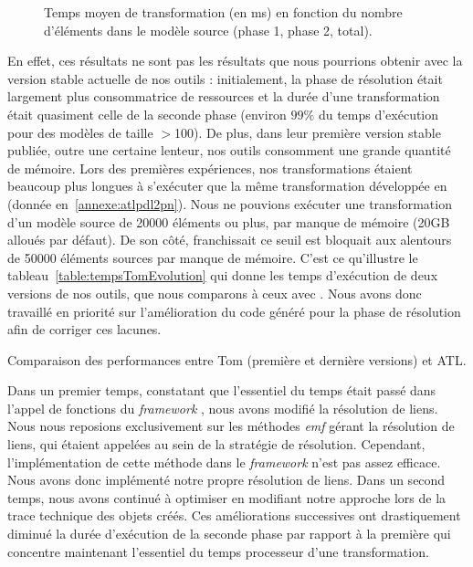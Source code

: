 \begin{figure}[h]
  \begin{center}
    
  \caption{Temps moyen de transformation (en ms) en fonction du nombre d'éléments
  dans le modèle source (phase 1, phase 2, total).}
  \label{fig:courbeTemps}
  \end{center}
\end{figure}

En effet, ces résultats ne sont pas les résultats que nous pourrions obtenir
avec la version stable actuelle de nos outils : initialement, la phase de
résolution était largement plus consommatrice de ressources et la durée d'une
transformation était quasiment celle de la seconde phase (environ $99\%$ du
temps d'exécution pour des modèles de taille $>$100). De plus, dans leur
première version stable publiée, outre une certaine lenteur, nos outils
consomment une grande quantité de mémoire. Lors des premières expériences, nos
transformations étaient beaucoup plus longues à s'exécuter que la même
transformation développée en {\atl} (donnée en~\ref{annexe:atlpdl2pn}). Nous ne
pouvions exécuter une transformation d'un modèle source de \num{20000} éléments
ou plus, par manque de mémoire (20GB alloués par défaut). De son côté, {\atl}
franchissait ce seuil est bloquait aux alentours de \num{50000} éléments
sources par manque de mémoire. C'est ce qu'illustre le
tableau~\ref{table:tempsTomEvolution} qui donne les temps d'exécution de deux
versions de nos outils, que nous comparons à ceux avec {\atl}. Nous avons donc
travaillé en priorité sur l'amélioration du code généré pour la phase de
résolution afin de corriger ces lacunes. 

\begin{table}[h]
  \begin{center}
    
    \caption{Comparaison des performances entre Tom (première et dernière
    versions) et ATL.}
    \label{table:tempsTomEvolution}
  \end{center}
\end{table}

Dans un premier temps, constatant que l'essentiel du temps était passé dans
l'appel de fonctions du \emph{framework} {\emf}, nous avons modifié la
résolution de liens. Nous nous reposions exclusivement sur les méthodes
\emph{emf} gérant la résolution de liens, qui étaient appelées au sein de la
stratégie de résolution. Cependant, l'implémentation de cette méthode dans le
\emph{framework} {\emf} n'est pas assez efficace. Nous avons donc implémenté
notre propre résolution de liens. Dans un second temps, nous avons continué à
optimiser en modifiant notre approche lors de la trace technique des objets
créés. Ces améliorations successives ont drastiquement diminué la durée
d'exécution de la seconde phase par rapport à la première qui concentre
maintenant l'essentiel du temps processeur d'une transformation.

